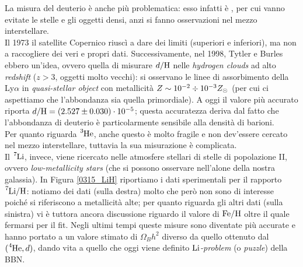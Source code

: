 \noindent La misura del deuterio è anche più problematica: esso infatti è , per cui vanno evitate le stelle e gli oggetti densi, anzi si fanno osservazioni nel mezzo interstellare.\\
Il 1973 il satellite Copernico riuscì a dare dei limiti (superiori e inferiori), ma non a raccogliere dei veri e propri dati. Successivamente, nel 1998, Tytler e Burles ebbero un'idea, ovvero quella di misurare $d/\ce{H}$ nelle \textit{hydrogen clouds} ad alto \textit{redshift} ($z>3$, oggetti molto vecchi): si osservano le linee di assorbimento della Ly$\alpha$ in \textit{quasi-stellar object} con metallicità $Z \sim 10^{-2}\div10^{-3} Z_{\odot}{}$ (per cui ci aspettiamo che l'abbondanza sia quella primordiale). A oggi il valore più accurato riporta $d/\ce{H} = (2.527 \pm 0.030)\cdot\ord{-5}$; questa accuratezza deriva dal fatto che l'abbondanza di deuterio è particolarmente sensibile alla densità di barioni.\\
Per quanto riguarda $\ce{^3He}$, anche questo è molto fragile e non dev'essere cercato nel mezzo interstellare, tuttavia la sua misurazione è complicata.\\
Il $\ce{^7Li}$, invece, viene ricercato nelle atmosfere stellari di stelle di popolazione II, ovvero \textit{low-metallicity stars} (che si possono osservare nell'alone della nostra galassia). In Figura \ref{0315_LiH} riportiamo i dati sperimentali per il rapporto $\ce{^7Li}/\ce{H}$: notiamo dei dati (sulla destra) molto  che però non sono di interesse poiché si riferiscono a metallicità alte; per quanto riguarda gli altri dati (sulla sinistra) vi è tuttora ancora discussione riguardo il valore di $\ce{Fe}/\ce{H}$ oltre il quale fermarsi per il fit. Negli ultimi tempi queste misure sono diventate più accurate e hanno portato a un valore stimato di $\Omega_B h^2$ diverso da quello ottenuto dal $(\ce{^4He},d)$, dando vita a quello che oggi viene definito \textit{$\ce{Li}$-problem} (o \textit{puzzle}) della BBN.

